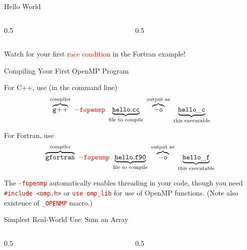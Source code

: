 \documentclass[10pt]{beamer}
\begin{document}
\begin{frame}{Hello World}

\begin{columns}[c]
  \begin{column}{0.5\textwidth}
    
  \end{column}
  \begin{column}{0.5\textwidth}
    
  \end{column}
\end{columns}
\vfill 
Watch for your first \textcolor{red}{race condition}
in the Fortran example!

\end{frame}

\begin{frame}{Compiling Your First OpenMP Program}

For C++, use (in the command line)
\begin{equation*}
 \overbrace{\tt g\!+\!+}^{\text{compiler}}~
   \textcolor{red}{\tt{-fopenmp}}~
   \underbrace{\tt{hello.cc}}_{\text{file to compile}}~
     \overbrace{\tt{-o}}^{\text{output as}}~
       \underbrace{\tt{hello\_c}}_{\text{this executable}} 
\end{equation*}
\vfill 

For Fortran, use
\begin{equation*}
 \overbrace{\tt gfortran}^{\text{compiler}}~
   \textcolor{red}{\tt{-fopenmp}}~
   \underbrace{\tt{hello.f90}}_{\text{file to compile}}~
     \overbrace{\tt{-o}}^{\text{output as}}~
       \underbrace{\tt{hello\_f}}_{\text{this executable}} 
\end{equation*}

\vfill 
The \textcolor{red}{\tt{-fopenmp}} automatically enables threading
in your code, though you need \textcolor{red}{\tt \#include <omp.h>} or
\textcolor{red}{\tt use omp\_lib} for use 
of OpenMP functions.  (Note also existence of \textcolor{red}{\tt \_OPENMP}
macro.)
\end{frame}

\begin{frame}{Simplest Real-World Use: Sum an Array}

\begin{columns}[c]
  \begin{column}{0.5\textwidth}
    
  \end{column}
  \begin{column}{0.5\textwidth}
    
  \end{column}
\end{columns}

\end{frame}
\end{document}
